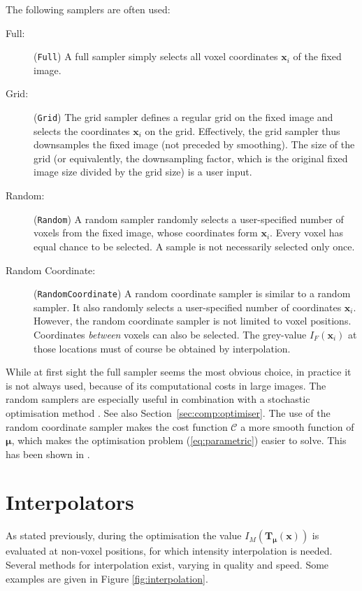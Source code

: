 \documentclass[]{report}
\newcommand{\vx}{\bm{x}}
\newcommand{\vmu}{\bm{\mu}}
\newcommand{\vTmx}{\bm{T}_{\vmu}(\bm{x})}
\newcommand{\CC}{\mathcal{C}}
\begin{document}
The following samplers are often used:
\begin{description}
\item[Full:] (\texttt{Full}) A full sampler simply selects all voxel coordinates $\vx_i$ of the
fixed image.

\item[Grid:] (\texttt{Grid}) The grid sampler defines a regular grid on the fixed
image and selects the coordinates $\vx_i$ on the grid. Effectively,
the grid sampler thus downsamples the fixed image (not preceded by
smoothing). The size of the grid (or equivalently, the downsampling
factor, which is the original fixed image size divided by the grid
size) is a user input.

\item[Random:] (\texttt{Random}) A random sampler randomly selects a user-specified number of
voxels from the fixed image, whose coordinates form $\vx_i$. Every
voxel has equal chance to be selected. A sample is not necessarily
selected only once.

\item[Random Coordinate:] (\texttt{RandomCoordinate}) A random coordinate sampler is similar
to a random sampler. It also randomly selects a user-specified number
of coordinates $\vx_i$. However, the random coordinate sampler is not
limited to voxel positions. Coordinates \emph{between} voxels can
also be selected. The grey-value $I_F(\vx_i)$ at those locations must
of course be obtained by interpolation.

\end{description}

While at first sight the full sampler seems the most obvious
choice, in practice it is not always used, because of its
computational costs in large images. The random samplers are
especially useful in combination with a stochastic optimisation
method \citep{KleinEA07}. See also
Section~\ref{sec:comp:optimiser}. The use of the random coordinate
sampler makes the cost function $\CC$ a more smooth function of
$\vmu$, which makes the optimisation problem (\ref{eq:parametric})
easier to solve. This has been shown in \cite{The08:Halton}.

\section{Interpolators}\label{sec:comp:interpolator}

As stated previously, during the optimisation the value $I_M(\vTmx)$
is evaluated at non-voxel positions, for which intensity
interpolation is needed. Several methods for interpolation exist,
varying in quality and speed. Some examples are given in Figure
\ref{fig:interpolation}.
\end{document}
